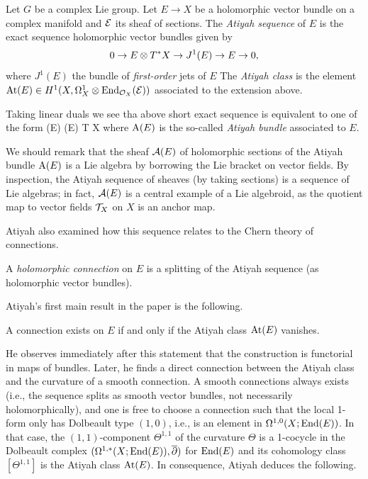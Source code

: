 \begin{dfn}
Let $G$ be a complex Lie group. Let $E \to X$ be a holomorphic vector
bundle on a complex manifold and $\mathcal E$ its sheaf of sections. The {\em Atiyah sequence} of $E$ is the
exact sequence holomorphic vector bundles given by
\[
0 \to E \otimes T^* X \to J^1(E) \to E \to 0,
\]
where $J^1(E)$ the bundle of {\em first-order} jets of $E$
The {\em Atiyah class} is the element ${\rm At}(E) \in H^1(X, \Omega^1_X
\otimes {\rm End}_{\mathcal O_X} (\mathcal E))$ associated to the extension above. 
\end{dfn}

\begin{rmk}
Taking linear duals we see tha above short exact sequence is
equivalent to one of the form
 \to \End (E) (E) \to T X 
\een
where ${\rm A}(E)$ is the so-called {\em Atiyah bundle} associated to $E$. 

We should remark that the sheaf $\mathcal A(E)$ of holomorphic sections of the Atiyah bundle ${\rm A}(E)$ is a Lie algebra by borrowing the Lie bracket on vector fields.
By inspection, the Atiyah sequence of sheaves (by taking sections) is a sequence of Lie algebras; 
 in fact, $\mathcal A(E)$ is a central example of a Lie algebroid, as the quotient map to vector fields $\mathcal T_X$ on $X$ is an anchor map.
\end{rmk}

Atiyah also examined how this sequence relates to the Chern theory of connections.

\begin{prop} 
A {\em holomorphic connection} on $E$ is a splitting of the Atiyah sequence (as holomorphic vector bundles).
\end{prop}

Atiyah's first main result in the paper is the following.

\begin{prop}
A connection exists on $E$ if and only if the Atiyah class ${\rm At}(E)$ vanishes.
\end{prop}

He observes immediately after this statement that the construction is
functorial in maps of bundles. Later, he finds a direct connection
between the Atiyah class and the curvature of a smooth connection. A
smooth connections always exists (i.e., the sequence splits as smooth
vector bundles, not necessarily holomorphically), and one is free to
choose a connection such that the local 1-form only has
Dolbeault type $(1,0)$, i.e., is an element in $\Omega^{1,0}(X; {\rm End}(E))$. In that case, the $(1,1)$-component
$\Theta^{1,1}$ of the curvature $\Theta$ is a 1-cocycle in the
Dolbeault complex $(\Omega^{1,*}(X ; {\rm End}(E)), \overline{\partial})$ for ${\rm End}(E)$ and its cohomology class $[\Theta^{1,1}]$ is the Atiyah class ${\rm At}(E)$. In consequence, Atiyah deduces the following.


